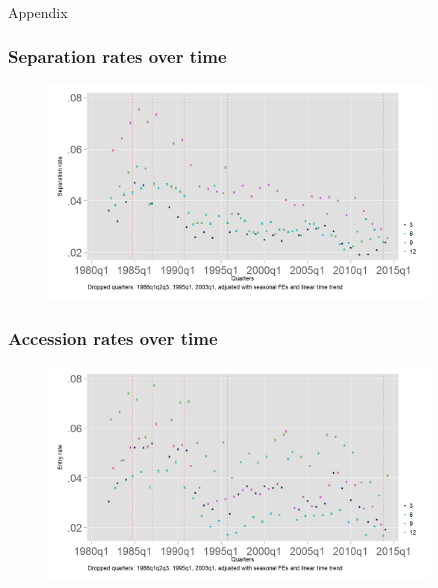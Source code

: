 \documentclass[aspectratio=169]{beamer}
\begin{document}
\begin{frame}
    \frametitle{}

    Appendix

\end{frame}

\begin{frame}
    \frametitle{Separation rates over time}

    \begin{figure}[]
        \centering
        \includegraphics[width=0.9\textwidth]{../output/separation_rate_CI.png}
    \end{figure}

\end{frame}

\begin{frame}
    \frametitle{Accession rates over time}

    \begin{figure}[]
        \centering
        \includegraphics[width=0.9\textwidth]{../output/accession_rate_CI.png}
    \end{figure}

\end{frame}
\end{document}
